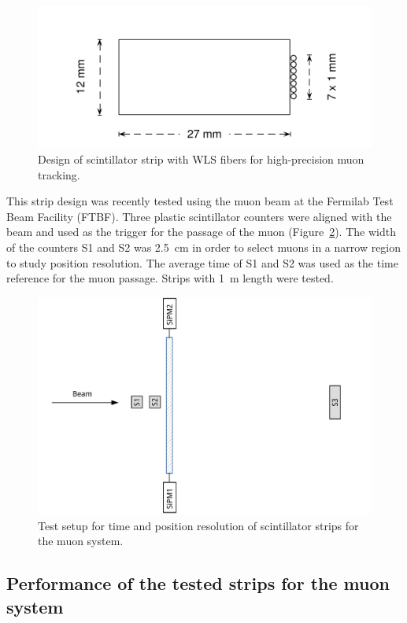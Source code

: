 \begin{figure}
  \centering
  \includegraphics[width=.6\textwidth]{MuonDetector/Scintillator/bicron}
  \caption{\label{fig:design} Design of scintillator strip with WLS fibers
  for high-precision muon tracking.}
\end{figure}

This strip design was recently tested using the muon beam at the Fermilab Test Beam Facility (FTBF). Three plastic scintillator counters were aligned with the beam and used as the trigger for the passage of the muon (Figure~\ref{fig:setup}). The width of the counters \textsf{S1} and \textsf{S2} was \SI{2.5}{cm} in order to select muons in a narrow region to study position resolution. The average time of \textsf{S1} and \textsf{S2} was used as the time reference for the muon passage. Strips with \SI{1}{m} length were tested.

\begin{figure}[h!]
  \centering
  \includegraphics[width=.9\textwidth]{MuonDetector/Scintillator/setup}
  \caption{\label{fig:setup} Test setup for time and position resolution of scintillator strips for the muon system.}
\end{figure}


\subsection{Performance of the tested strips for the muon system}

